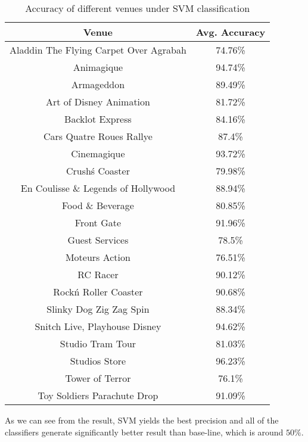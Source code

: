 \documentclass[12pt]{article}
\begin{document}
\begin{table}
\begin{center}
    \begin{tabular}{ | c | c | }
        \hline
        \textbf {Venue} & \textbf{Avg. Accuracy} \\ \hline
        \hline
        Aladdin The Flying Carpet Over Agrabah & 74.76\% \\ \hline
        Animagique & 94.74\% \\ \hline
        Armageddon & 89.49\% \\ \hline
        Art of Disney Animation & 81.72\% \\ \hline
        Backlot Express & 84.16\% \\ \hline
        Cars Quatre Roues Rallye & 87.4\% \\ \hline
        Cinemagique & 93.72\% \\ \hline
        Crush\'s Coaster & 79.98\% \\ \hline
        En Coulisse \& Legends of Hollywood & 88.94\% \\ \hline
        Food \& Beverage & 80.85\% \\ \hline
        Front Gate & 91.96\% \\ \hline
        Guest Services & 78.5\% \\ \hline
        Moteurs Action & 76.51\% \\ \hline
        RC Racer & 90.12\% \\ \hline
        Rock\'n Roller Coaster & 90.68\% \\ \hline
        Slinky Dog Zig Zag Spin & 88.34\% \\ \hline
        Snitch Live, Playhouse Disney & 94.62\% \\ \hline
        Studio Tram Tour & 81.03\% \\ \hline
        Studios Store & 96.23\% \\ \hline
        Tower of Terror & 76.1\% \\ \hline
        Toy Soldiers Parachute Drop & 91.09\% \\ \hline
    \end{tabular}
\caption{Accuracy of different venues under SVM classification}
\label{venue-accu}
\end{center}
\end{table}


As we can see from the result, SVM yields the best precision and all of the classifiers generate significantly better result than base-line, which is around $50\%$. 
\end{document}
